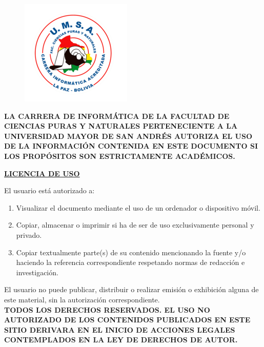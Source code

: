 \begin{figure}[ht]
\begin{minipage}{0.2\textwidth}
    \includegraphics[width=\linewidth]{images/logo-inf.png}
  \end{minipage}
\end{figure}
\noindent \textbf{LA CARRERA DE INFORMÁTICA DE LA FACULTAD DE CIENCIAS PURAS Y NATURALES PERTENECIENTE A LA UNIVERSIDAD MAYOR DE SAN ANDRÉS AUTORIZA EL USO DE LA INFORMACIÓN CONTENIDA EN ESTE DOCUMENTO SI LOS PROPÓSITOS SON ESTRICTAMENTE ACADÉMICOS.} \\
\begin{center}
  \textbf{\underline{LICENCIA DE USO}}
\end{center}
El usuario está autorizado a:
\vspace{-1em}
\begin{enumerate}[label=\alph*), itemsep=-3pt]
  \item Visualizar el documento mediante el uso de un ordenador o dispositivo móvil.
  \item Copiar, almacenar o imprimir si ha de ser de uso exclusivamente personal y privado.
  \item Copiar textualmente parte(s) de su contenido mencionando la fuente y/o haciendo la referencia correspondiente respetando normas de redacción e investigación.
\end{enumerate}
El usuario no puede publicar, distribuir o realizar emisión o exhibición alguna de este material, sin la autorización correspondiente. \\
\textbf{TODOS LOS DERECHOS RESERVADOS. EL USO NO AUTORIZADO DE LOS CONTENIDOS PUBLICADOS EN ESTE SITIO DERIVARA EN EL INICIO DE ACCIONES LEGALES CONTEMPLADOS EN LA LEY DE DERECHOS DE AUTOR.}
